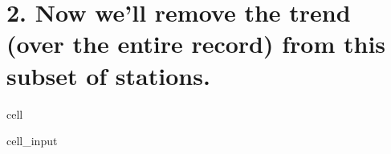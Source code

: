 \documentclass[letterpaper,10pt,english]{jupyterBook}
\begin{document}
\section{2. Now we’ll remove the trend (over the entire record) from this subset of stations.}
\label{\detokenize{notebooks/regional_and_local/SL_anomaly_annual:now-we-ll-remove-the-trend-over-the-entire-record-from-this-subset-of-stations}}
\begin{sphinxuseclass}{cell}\begin{sphinxVerbatimInput}

\begin{sphinxuseclass}{cell_input}
\begin{sphinxVerbatim}[commandchars=\\\{\}]
    \PYG{p}{[}\PYG{p}{]}

\PYG{p}{[}\PYG{p}{]}  \PYG{p}{[}\PYG{p}{]}  
\end{sphinxVerbatim}

\end{sphinxuseclass}\end{sphinxVerbatimInput}

\end{sphinxuseclass}
\end{document}

